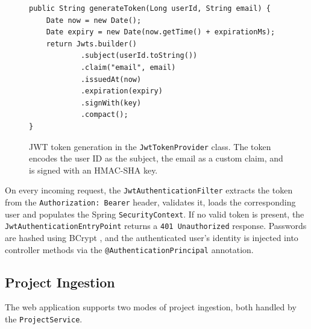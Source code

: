 
\begin{figure}[htbp]
    \begin{verbatim}
public String generateToken(Long userId, String email) {
    Date now = new Date();
    Date expiry = new Date(now.getTime() + expirationMs);
    return Jwts.builder()
            .subject(userId.toString())
            .claim("email", email)
            .issuedAt(now)
            .expiration(expiry)
            .signWith(key)
            .compact();
}
    \end{verbatim}
    \caption{JWT token generation in the \texttt{JwtTokenProvider} class. The token encodes the user ID as the subject, the email as a custom claim, and is signed with an HMAC-SHA key.}
    \label{lst:jwt-generate}
\end{figure}

On every incoming request, the \texttt{JwtAuthenticationFilter} extracts the token from the \texttt{Authorization: Bearer} header, validates it, loads the corresponding user and populates the Spring \texttt{SecurityContext}. If no valid token is present, the \texttt{JwtAuthenticationEntryPoint} returns a \texttt{401 Unauthorized} response. Passwords are hashed using BCrypt \cite{Provos1999}, and the authenticated user's identity is injected into controller methods via the \texttt{@AuthenticationPrincipal} annotation.

\subsection{Project Ingestion}
\label{subsec:project-ingestion}

\par The web application supports two modes of project ingestion, both handled by the \texttt{ProjectService}.

